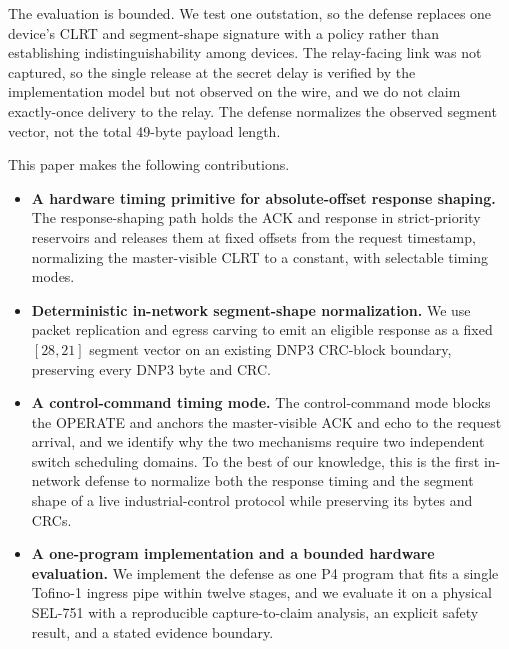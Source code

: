 The evaluation is bounded. We test one outstation, so the defense replaces one device's CLRT and
segment-shape signature with a policy rather than establishing indistinguishability among devices. The
relay-facing link was not captured, so the single release at the secret delay is verified by the
implementation model but not observed on the wire, and we do not claim exactly-once delivery to the
relay. The defense normalizes the observed segment vector, not the total 49-byte payload length.

This paper makes the following contributions.
\begin{itemize}
\item \textbf{A hardware timing primitive for absolute-offset response shaping.} The response-shaping
path holds the ACK and response in strict-priority reservoirs and releases them at fixed offsets from
the request timestamp, normalizing the master-visible CLRT to a constant, with selectable timing modes.
\item \textbf{Deterministic in-network segment-shape normalization.} We use packet replication and
egress carving to emit an eligible response as a fixed $[28,21]$ segment vector on an existing DNP3
CRC-block boundary, preserving every DNP3 byte and CRC.
\item \textbf{A control-command timing mode.} The control-command mode blocks the OPERATE and anchors
the master-visible ACK and echo to the request arrival, and we identify why the two mechanisms require
two independent switch scheduling domains. To the best of our knowledge, this is the first in-network
defense to normalize
both the response timing and the segment shape of a live industrial-control protocol while preserving
its bytes and CRCs.
\item \textbf{A one-program implementation and a bounded hardware evaluation.} We implement the defense
as one P4 program that fits a single Tofino-1 ingress pipe within twelve stages, and we evaluate it on
a physical SEL-751 with a reproducible capture-to-claim analysis, an explicit safety result, and a
stated evidence boundary.
\end{itemize}
